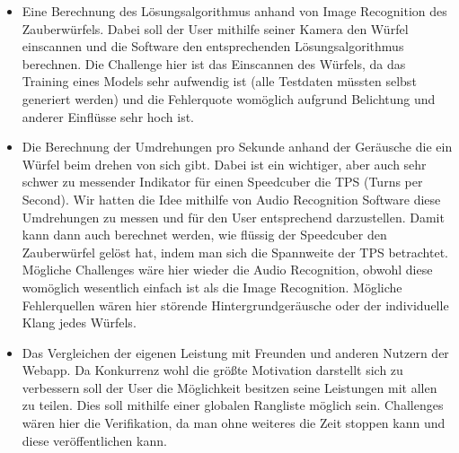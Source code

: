 \documentclass[a4paper]{article}
\theoremstyle{definition}
\begin{document}
\begin{itemize}
	\item Eine Berechnung des Lösungsalgorithmus anhand von Image Recognition des Zauberwürfels. Dabei soll der
	      User mithilfe seiner Kamera den Würfel einscannen und die Software den entsprechenden Lösungsalgorithmus
	      berechnen. Die Challenge hier ist das Einscannen des Würfels, da das Training eines Models sehr aufwendig ist
	      (alle Testdaten müssten selbst generiert werden) und die Fehlerquote womöglich aufgrund Belichtung und anderer
	      Einflüsse sehr hoch ist.
	\item Die Berechnung der Umdrehungen pro Sekunde anhand der Geräusche die ein Würfel beim drehen von
	      sich gibt. Dabei ist ein wichtiger, aber auch sehr schwer zu messender Indikator für einen Speedcuber die TPS
	      (Turns per Second). Wir hatten die Idee mithilfe von Audio Recognition Software diese Umdrehungen zu messen
	      und für den User entsprechend darzustellen. Damit kann dann auch berechnet werden, wie flüssig der Speedcuber
	      den Zauberwürfel gelöst hat, indem man sich die Spannweite der TPS betrachtet. Mögliche Challenges wäre hier
	      wieder die Audio Recognition, obwohl diese womöglich wesentlich einfach ist als die Image Recognition. Mögliche
	      Fehlerquellen wären hier störende Hintergrundgeräusche oder der individuelle Klang jedes Würfels.
	\item Das Vergleichen der eigenen Leistung mit Freunden und anderen Nutzern der Webapp. Da Konkurrenz wohl die
	      größte Motivation darstellt sich zu verbessern soll der User die Möglichkeit besitzen seine Leistungen
	      mit allen zu teilen. Dies soll mithilfe einer globalen Rangliste möglich sein. Challenges wären hier die
	      Verifikation, da man ohne weiteres die Zeit stoppen kann und diese veröffentlichen kann.
\end{itemize}

\clearpage



\end{document}

